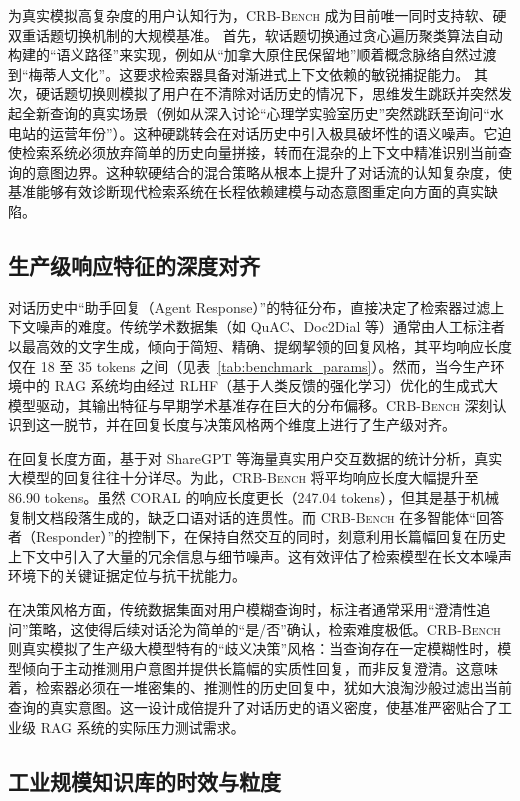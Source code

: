 为真实模拟高复杂度的用户认知行为，\textsc{CRB-Bench} 成为目前唯一同时支持软、硬双重话题切换机制的大规模基准。
首先，软话题切换通过贪心遍历聚类算法自动构建的“语义路径”来实现，例如从“加拿大原住民保留地”顺着概念脉络自然过渡到“梅蒂人文化”。这要求检索器具备对渐进式上下文依赖的敏锐捕捉能力。
其次，硬话题切换则模拟了用户在不清除对话历史的情况下，思维发生跳跃并突然发起全新查询的真实场景（例如从深入讨论“心理学实验室历史”突然跳跃至询问“水电站的运营年份”）。这种硬跳转会在对话历史中引入极具破坏性的语义噪声。它迫使检索系统必须放弃简单的历史向量拼接，转而在混杂的上下文中精准识别当前查询的意图边界。这种软硬结合的混合策略从根本上提升了对话流的认知复杂度，使基准能够有效诊断现代检索系统在长程依赖建模与动态意图重定向方面的真实缺陷。

\subsection{生产级响应特征的深度对齐}

对话历史中“助手回复（Agent Response）”的特征分布，直接决定了检索器过滤上下文噪声的难度。传统学术数据集（如 QuAC、Doc2Dial 等）通常由人工标注者以最高效的文字生成，倾向于简短、精确、提纲挈领的回复风格，其平均响应长度仅在 18 至 35 tokens 之间（见表~\ref{tab:benchmark_params}）。然而，当今生产环境中的 RAG 系统均由经过 RLHF（基于人类反馈的强化学习）优化的生成式大模型驱动，其输出特征与早期学术基准存在巨大的分布偏移。\textsc{CRB-Bench} 深刻认识到这一脱节，并在回复长度与决策风格两个维度上进行了生产级对齐。

在回复长度方面，基于对 ShareGPT 等海量真实用户交互数据的统计分析，真实大模型的回复往往十分详尽。为此，\textsc{CRB-Bench} 将平均响应长度大幅提升至 86.90 tokens。虽然 CORAL 的响应长度更长（247.04 tokens），但其是基于机械复制文档段落生成的，缺乏口语对话的连贯性。而 \textsc{CRB-Bench} 在多智能体“回答者（Responder）”的控制下，在保持自然交互的同时，刻意利用长篇幅回复在历史上下文中引入了大量的冗余信息与细节噪声。这有效评估了检索模型在长文本噪声环境下的关键证据定位与抗干扰能力。

在决策风格方面，传统数据集面对用户模糊查询时，标注者通常采用“澄清性追问”策略，这使得后续对话沦为简单的“是/否”确认，检索难度极低。\textsc{CRB-Bench} 则真实模拟了生产级大模型特有的“歧义决策”风格：当查询存在一定模糊性时，模型倾向于主动推测用户意图并提供长篇幅的实质性回复，而非反复澄清。这意味着，检索器必须在一堆密集的、推测性的历史回复中，犹如大浪淘沙般过滤出当前查询的真实意图。这一设计成倍提升了对话历史的语义密度，使基准严密贴合了工业级 RAG 系统的实际压力测试需求。

\subsection{工业规模知识库的时效与粒度}

